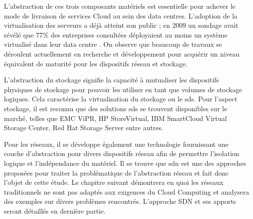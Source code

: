 L'abstraction de ces trois composants matériels est essentielle pour achever le mode de livraison de services Cloud au sein des data centres. L'adoption de la virtualisation des serveurs a déjà atteint son public ; en 2009 un sondage avait révélé que 77\% des entreprises consultées déployaient au moins un système virtualisé dans leur data centre \cite{x86ServersVirtualization}. On observe que beaucoup de travaux se déroulent actuellement en recherche et développement pour acquérir un niveau équivalent de maturité pour les dispositifs réseau et stockage. 

L'abstraction du stockage signifie la capacité à mutualiser les dispositifs physiques de stockage pour pouvoir les utiliser en tant que volumes de stockage logiques. Cela caractérise la virtualisation du stockage ou le \gls{sds}. Pour l'aspect stockage, il est reconnu que des solutions \gls{sds} se trouvent disponibles sur le marché, telles que EMC ViPR, HP StoreVirtual, IBM SmartCloud Virtual Storage Center, Red Hat Storage Server entre autres.

Pour les réseaux, il se développe également une technologie fournissant une couche d'abstraction pour divers dispositifs réseau afin de permettre l'isolation logique et l'indépendance du matériel. Il se trouve que \gls{sdn} est une des approches proposées pour traiter la problématique de l'abstraction réseau et fait donc l'objet de cette étude. Le chapitre suivant démontrera en quoi les réseaux traditionnels ne sont pas adaptés aux exigences du Cloud Computing et analysera des exemples sur divers problèmes rencontrés. L'approche SDN et ses apports seront détaillés en dernière partie. \cite{journeySDDC} \cite{ciscoCCDCStrategyArchiSolutions} \cite{ibmPlanningVirtCCchap1}  \cite{cloudReadyJuniperReferenceDef}

